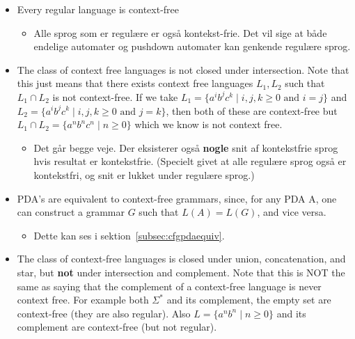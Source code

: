 \begin{itemize}
  \item Every regular language is context-free
        \begin{itemize}
          \item Alle sprog som er regulære er også kontekst-frie. Det vil sige at både endelige automater og pushdown automater kan genkende regulære sprog.
        \end{itemize}

  \item The class of context free languages is not closed under intersection. Note that this just means that there exists context free languages $L_{1}, L_{2}$ such that $L_{1} \cap L_{2}$ is not context-free. If we take $L_{1} = \{a^{i}b^{j}c^{k}\;|\; i,j,k \ge 0 \text{ and } i = j\}$ and $L_{2} = \{a^{i}b^{j}c^{k}\;|\;i,j,k \ge 0 \text{ and } j = k\}$, then both of these are context-free but $L_{1} \cap L_{2} = \{a^{n}b^{n}c^{n}\; | \; n \ge 0\}$ which we know is not context free.

        \begin{itemize}
          \item Det går begge veje. Der eksisterer også \textbf{nogle} snit af kontekstfrie sprog hvis resultat er kontekstfrie. (Specielt givet at alle regulære sprog også er kontekstfri, og snit er lukket under regulære sprog.)
        \end{itemize}

  \item PDA’s are equivalent to context-free grammars, since, for any PDA A, one can construct a grammar $G$ such that $L(A) = L(G)$, and vice versa.
        \begin{itemize}
          \item Dette kan ses i sektion~\ref{subsec:cfgpdaequiv}.
        \end{itemize}
  \item The class of context-free languages is closed under union, concatenation, and star, but \textbf{not} under intersection and complement. Note that this is NOT the same as saying that the complement of a context-free language is never context free. For example both $\Sigma^{*}$ and its complement, the empty set are context-free (they are also regular). Also $L = \{a^{n}b^{n}\; | \; n \ge 0\}$ and its complement are context-free (but not regular).


\end{itemize}
